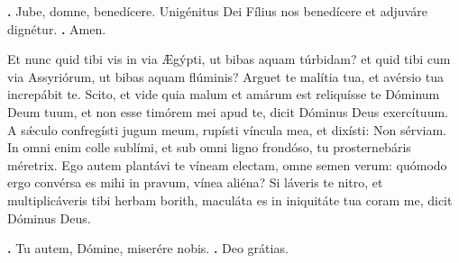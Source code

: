 \begin{small}
\textbf{\Vbar.} Jube, domne, benedícere.
Unigénitus Dei Fílius nos benedícere et adjuváre dignétur. \textbf{\Rbar.} Amen.
\end{small}


Et nunc quid tibi vis in via Ægýpti, ut bibas aquam túrbidam? et quid tibi cum via Assyriórum, ut bibas aquam flúminis? 
Arguet te malítia tua, et avérsio tua increpábit te. Scito, et vide quia malum et amárum est reliquísse te Dóminum Deum tuum, et non esse timórem mei apud te, dicit Dóminus Deus exercítuum. 
A s\'{\ae}culo confregísti jugum meum, rupísti víncula mea, et dixísti: Non sérviam. In omni enim colle sublími, et sub omni ligno frondóso, tu prosternebáris méretrix. 
Ego autem plantávi te víneam electam, omne semen verum: quómodo ergo convérsa es mihi in pravum, vínea aliéna? 
Si láveris te nitro, et multiplicáveris tibi herbam borith, maculáta es in iniquitáte tua coram me, dicit Dóminus Deus.

\textbf{\Vbar.} Tu autem, Dómine, miserére nobis.
\textbf{\Rbar.} Deo grátias.


